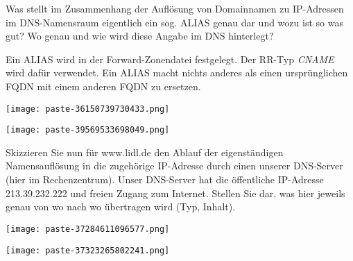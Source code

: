 \documentclass{article}
\begin{document}
\begin{tcolorbox}[colback=white!10!white,colframe=lightgray!75!black,
  savelowerto=\jobname_ex.tex,breakable,enhanced,lines before break=40]

\justifying
Was stellt im Zusammenhang der Auflösung von Domainnamen zu IP-Adressen im DNS-Namensraum eigentlich ein sog. ALIAS genau dar und wozu ist so was gut? Wo genau und wie wird diese Angabe im DNS hinterlegt?

\tcblower

\justifying
Ein ALIAS wird in der Forward-Zonendatei festgelegt. Der RR-Typ \textit{CNAME} wird dafür verwendet. Ein ALIAS macht nichts anderes als einen ursprünglichen FQDN mit einem anderen FQDN zu ersetzen.\begin{center}
\texttt{[image: paste-36150739730433.png]}
\end{center}
\begin{center}
\texttt{[image: paste-39569533698049.png]}
\end{center}

\end{tcolorbox}
\begin{tcolorbox}[colback=white!10!white,colframe=lightgray!75!black,
  savelowerto=\jobname_ex.tex,breakable,enhanced,lines before break=40]

\justifying
Skizzieren Sie nun für www.lidl.de den Ablauf der eigenständigen Namensauflösung in die zugehörige IP-Adresse durch einen unserer DNS-Server (hier im Rechenzentrum). Unser DNS-Server hat die öffentliche IP-Adresse 213.39.232.222 und freien Zugang zum Internet. Stellen Sie dar, was hier jeweils genau von wo nach wo übertragen wird (Typ, Inhalt).\begin{center}
\texttt{[image: paste-37284611096577.png]}
\end{center}


\tcblower

\justifying
\begin{center}
\texttt{[image: paste-37323265802241.png]}
\end{center}

\end{tcolorbox}
\end{document}
